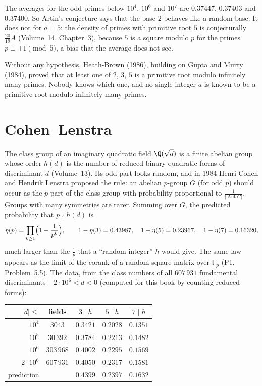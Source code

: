 The averages for the odd primes below $10^4$, $10^6$ and $10^7$ are $0.37447$, $0.37403$ and $0.37400$. So Artin's conjecture says that the base $2$ behaves like a
random base. It does not for $a=5$: the density of primes with primitive root $5$ is conjecturally $\frac{20}{19}A$ (Volume~14, Chapter~3), because $5$ is a square modulo $p$ for
the primes $p\equiv\pm1\pmod5$, a bias that the average does not see.

\begin{remark}\label{conjectures:rem:artinknown}
Without any hypothesis, Heath-Brown (1986), building on Gupta and Murty (1984), proved that at least one of $2$, $3$, $5$ is a primitive root modulo infinitely many
primes. Nobody knows which one, and no single integer $a$ is known to be a primitive root modulo infinitely many primes.
\end{remark}

\section{Cohen--Lenstra}

The class group of an imaginary quadratic field $\Q(\sqrt d)$ is a finite abelian group whose order $h(d)$ is the number of reduced binary quadratic
forms of discriminant $d$ (Volume~13). Its odd part looks random, and in 1984 Henri Cohen and Hendrik Lenstra proposed the rule: an abelian $p$-group $G$ (for odd $p$)
should occur as the $p$-part of the class group with probability proportional to $\frac1{|\operatorname{Aut}G|}$. Groups with many symmetries are rarer.
Summing over $G$, the predicted probability that $p\nmid h(d)$ is
\[
\eta(p)=\prod_{k\ge1}\Bigl(1-\frac1{p^k}\Bigr),\qquad1-\eta(3)=0.43987,\quad1-\eta(5)=0.23967,\quad1-\eta(7)=0.16320,
\]
much larger than the $\frac1p$ that a ``random integer'' $h$ would give. The same law appears as the limit of the corank of a random square matrix over
$\mathbb F_p$ (P1, Problem~5.5). The data, from the class numbers of all $607\,931$ fundamental discriminants $-2\cdot10^6<d<0$ (computed for this book by
counting reduced forms):

\begin{center}
\begin{tabular}{rcccc}
$|d|\le$&fields&$3\mid h$&$5\mid h$&$7\mid h$\\\hline
$10^4$&$3043$&$0.3421$&$0.2028$&$0.1351$\\
$10^5$&$30\,392$&$0.3784$&$0.2213$&$0.1482$\\
$10^6$&$303\,968$&$0.4002$&$0.2295$&$0.1569$\\
$2\cdot10^6$&$607\,931$&$0.4050$&$0.2317$&$0.1581$\\\hline
prediction&&$0.4399$&$0.2397$&$0.1632$
\end{tabular}
\end{center}


